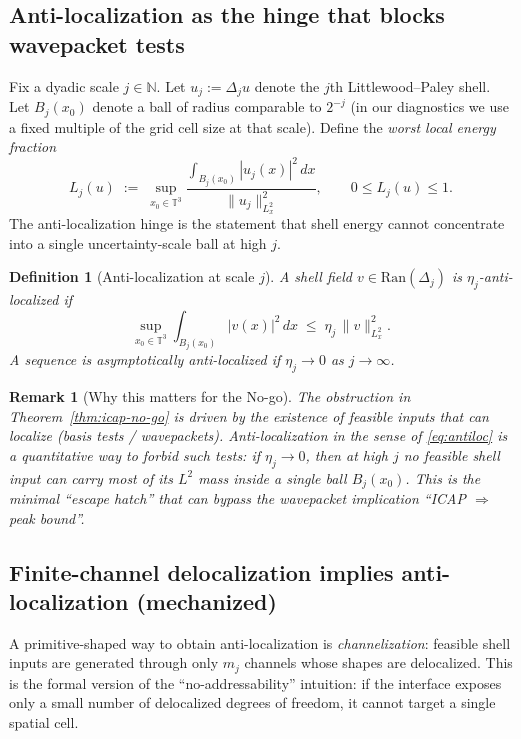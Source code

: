 \documentclass[11pt]{article}
\newcommand{\N}{\mathbb{N}}
\newcommand{\T}{\mathbb{T}}
\newtheorem{definition}{Definition}
\newtheorem{remark}{Remark}
\begin{document}
\subsection{Anti-localization as the hinge that blocks wavepacket tests}

Fix a dyadic scale $j\in\N$. Let $u_j := \Delta_j u$ denote the $j$th Littlewood--Paley shell.
Let $B_j(x_0)$ denote a ball of radius comparable to $2^{-j}$ (in our diagnostics we use a fixed
multiple of the grid cell size at that scale). Define the \emph{worst local energy fraction}
\begin{equation}
\label{eq:local-energy-fraction}
L_j(u) \;:=\;
\sup_{x_0\in\T^3}\frac{\int_{B_j(x_0)} |u_j(x)|^2\,dx}{\|u_j\|_{L^2_x}^2},
\qquad 0\le L_j(u)\le 1.
\end{equation}
The anti-localization hinge is the statement that shell energy cannot concentrate into
a single uncertainty-scale ball at high $j$.

\begin{definition}[Anti-localization at scale $j$]
\label{def:anti-localization}
A shell field $v\in \mathrm{Ran}(\Delta_j)$ is \emph{$\eta_j$-anti-localized} if
\begin{equation}
\label{eq:antiloc}
\sup_{x_0\in\T^3}\int_{B_j(x_0)} |v(x)|^2\,dx \;\le\; \eta_j \,\|v\|_{L^2_x}^2.
\end{equation}
A sequence is \emph{asymptotically anti-localized} if $\eta_j\to 0$ as $j\to\infty$.
\end{definition}

\begin{remark}[Why this matters for the No-go]
The obstruction in Theorem~\ref{thm:icap-no-go} is driven by the existence of feasible inputs
that can localize (basis tests / wavepackets). Anti-localization in the sense of
\eqref{eq:antiloc} is a quantitative way to forbid such tests: if $\eta_j\to 0$, then at high $j$
no feasible shell input can carry most of its $L^2$ mass inside a single ball $B_j(x_0)$.
This is the minimal ``escape hatch'' that can bypass the wavepacket implication
``ICAP $\Rightarrow$ peak bound''.
\end{remark}

\subsection{Finite-channel delocalization implies anti-localization (mechanized)}

A primitive-shaped way to obtain anti-localization is \emph{channelization}:
feasible shell inputs are generated through only $m_j$ channels whose shapes are delocalized.
This is the formal version of the ``no-addressability'' intuition: if the interface exposes only
a small number of delocalized degrees of freedom, it cannot target a single spatial cell.
\end{document}
